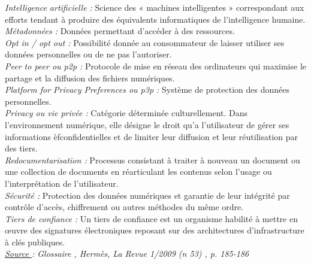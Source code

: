 \documentclass[a4paper,12pt]{article}
\begin{document}
\emph{Intelligence artificielle :} Science des « machines intelligentes » correspondant aux efforts tendant à produire des équivalents informatiques de l’intelligence humaine. \\


\emph{Métadonnées :} Données permettant d’accéder à des ressources. \\


\emph{Opt in / opt out :} Possibilité donnée au consommateur de laisser utiliser ses données personnelles ou de ne pas l’autoriser. \\


\emph{Peer to peer ou p2p :} Protocole de mise en réseau des ordinateurs qui maximise le partage et la diffusion des fichiers numériques. \\


\emph{Platform for Privacy Preferences ou p3p :} Système de protection des données personnelles. \\


\emph{Privacy ou vie privée :} Catégorie déterminée culturellement. Dans l’environnement numérique, elle désigne le droit qu’a l’utilisateur de gérer ses informations èfconfidentielles et de limiter leur diffusion et leur réutilisation par des tiers. \\


\emph{Redocumentarisation :} Processus consistant à traiter à nouveau un document ou une collection de documents en réarticulant les contenus selon l’usage ou l’interprétation de l’utilisateur. \\


\emph{Sécurité :} Protection des données numériques et garantie de leur intégrité par contrôle d’accès, chiffrement ou autres méthodes du même ordre. \\


\emph{Tiers de confiance :} Un tiers de confiance est un organisme habilité à mettre en œuvre des signatures électroniques reposant sur des architectures d’infrastructure à clés publiques. \\



\emph{\underline{Source }: \emph{Glossaire }, Hermès, La Revue 1/2009 (n 53) , p. 185-186 }
\end{document}

